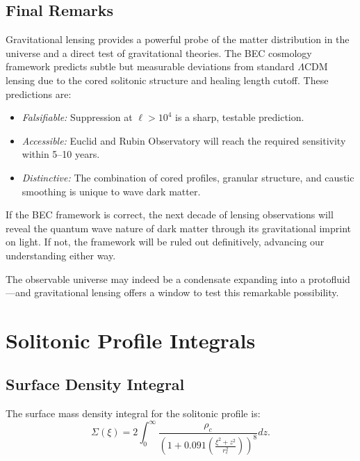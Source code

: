 \documentclass[11pt,a4paper]{article}
\theoremstyle{definition}
\theoremstyle{remark}
\begin{document}
\subsection{Final Remarks}
\label{sec:final_remarks}

Gravitational lensing provides a powerful probe of the matter distribution in the universe and a direct test of gravitational theories. The BEC cosmology framework predicts subtle but measurable deviations from standard $\Lambda$CDM lensing due to the cored solitonic structure and healing length cutoff. These predictions are:
\begin{itemize}[leftmargin=*, itemsep=0.2em]
\item \emph{Falsifiable:} Suppression at $\ell > 10^4$ is a sharp, testable prediction.
\item \emph{Accessible:} Euclid and Rubin Observatory will reach the required sensitivity within 5--10 years.
\item \emph{Distinctive:} The combination of cored profiles, granular structure, and caustic smoothing is unique to wave dark matter.
\end{itemize}

If the BEC framework is correct, the next decade of lensing observations will reveal the quantum wave nature of dark matter through its gravitational imprint on light. If not, the framework will be ruled out definitively, advancing our understanding either way.

The observable universe may indeed be a condensate expanding into a protofluid---and gravitational lensing offers a window to test this remarkable possibility.

\appendix

\section{Solitonic Profile Integrals}
\label{app:soliton_integrals}

\subsection{Surface Density Integral}

The surface mass density integral for the solitonic profile is:
\begin{equation}
\Sigma(\xi) = 2 \int_0^\infty \frac{\rho_c}{\left(1 + 0.091\left(\frac{\xi^2 + z^2}{r_c^2}\right)\right)^8} dz.
\end{equation}
\end{document}

